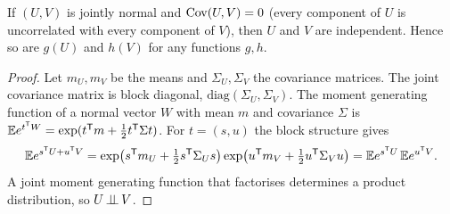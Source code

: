 \begin{lemma}\label{lem:L08-indep}
If $(U,V)$ is jointly normal and $\operatorname{Cov}(U,V)=0$ (every component of $U$ is uncorrelated with
every component of $V$), then $U$ and $V$ are independent. Hence so are $g(U)$ and $h(V)$ for any
functions $g,h$.
\end{lemma}
\begin{proof}
Let $m_U,m_V$ be the means and $\Sigma_U,\Sigma_V$ the covariance matrices. The joint covariance
matrix is block diagonal, $\mathrm{diag}(\Sigma_U,\Sigma_V)$. The moment generating function of a
normal vector $W$ with mean $m$ and covariance $\Sigma$ is $\mathbb E e^{t^{\mathsf T} W}=\exp(t^{\mathsf T} m+\tfrac12 t^{\mathsf T}\Sigma t)$.
For $t=(s,u)$ the block structure gives
\[
\mathbb E e^{s^{\mathsf T} U+u^{\mathsf T} V}=\exp\bigl(s^{\mathsf T} m_U+\tfrac12 s^{\mathsf T}\Sigma_Us\bigr)\exp\bigl(u^{\mathsf T} m_V+\tfrac12 u^{\mathsf T}\Sigma_Vu\bigr)
=\mathbb E e^{s^{\mathsf T} U}\,\mathbb E e^{u^{\mathsf T} V}.
\]
A joint moment generating function that factorises determines a product distribution, so $U\operatorname{\perp\!\!\!\perp} V$.
\end{proof}

